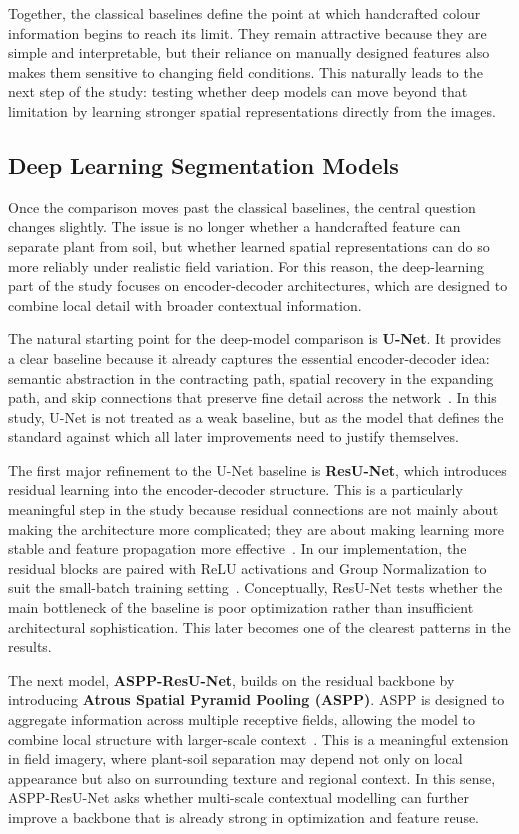 \documentclass[conference]{IEEEtran}
\begin{document}
Together, the classical baselines define the point at which handcrafted
colour information begins to reach its limit. They remain attractive
because they are simple and interpretable, but their reliance on
manually designed features also makes them sensitive to changing field
conditions. This naturally leads to the next step of the study: testing
whether deep models can move beyond that limitation by learning stronger
spatial representations directly from the images.

\subsection{Deep Learning Segmentation Models}

Once the comparison moves past the classical baselines, the central
question changes slightly. The issue is no longer whether a handcrafted
feature can separate plant from soil, but whether learned spatial
representations can do so more reliably under realistic field variation.
For this reason, the deep-learning part of the study focuses on
encoder-decoder architectures, which are designed to combine local
detail with broader contextual information.

The natural starting point for the deep-model comparison is
\textbf{U-Net}. It provides a clear baseline because it already captures
the essential encoder-decoder idea: semantic abstraction in the
contracting path, spatial recovery in the expanding path, and skip
connections that preserve fine detail across the
network~\cite{ronneberger2015}. In this study, U-Net is not treated as
a weak baseline, but as the model that defines the standard against
which all later improvements need to justify themselves.

The first major refinement to the U-Net baseline is \textbf{ResU-Net},
which introduces residual learning into the encoder-decoder structure.
This is a particularly meaningful step in the study because residual
connections are not mainly about making the architecture more
complicated; they are about making learning more stable and feature
propagation more effective~\cite{he2016}. In our implementation, the
residual blocks are paired with ReLU activations and Group Normalization
to suit the small-batch training setting~\cite{wu2018}. Conceptually,
ResU-Net tests whether the main bottleneck of the baseline is poor
optimization rather than insufficient architectural sophistication. This
later becomes one of the clearest patterns in the results.

The next model, \textbf{ASPP-ResU-Net}, builds on the residual backbone
by introducing \textbf{Atrous Spatial Pyramid Pooling (ASPP)}. ASPP is
designed to aggregate information across multiple receptive fields,
allowing the model to combine local structure with larger-scale
context~\cite{chen2017}. This is a meaningful extension in field
imagery, where plant-soil separation may depend not only on local
appearance but also on surrounding texture and regional context. In this
sense, ASPP-ResU-Net asks whether multi-scale contextual modelling can
further improve a backbone that is already strong in optimization and
feature reuse.
\end{document}
